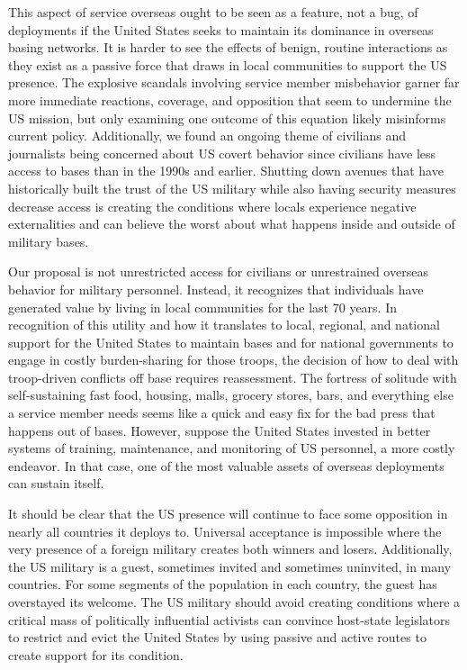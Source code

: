 This aspect of service overseas ought to be seen as a feature, not a bug, of deployments if the United States seeks to maintain its dominance in overseas basing networks. It is harder to see the effects of benign, routine interactions as they exist as a passive force that draws in local communities to support the US presence. The explosive scandals involving service member misbehavior garner far more immediate reactions, coverage, and opposition that seem to undermine the US mission, but only examining one outcome of this equation likely misinforms current policy. Additionally, we found an ongoing theme of civilians and journalists being concerned about US covert behavior since civilians have less access to bases than in the 1990s and earlier. Shutting down avenues that have historically built the trust of the US military while also having security measures decrease access is creating the conditions where locals experience negative externalities and can believe the worst about what happens inside and outside of military bases.

Our proposal is not unrestricted access for civilians or unrestrained overseas behavior for military personnel. Instead, it recognizes that individuals have generated value by living in local communities for the last 70 years. In recognition of this utility and how it translates to local, regional, and national support for the United States to maintain bases and for national governments to engage in costly burden-sharing for those troops, the decision of how to deal with troop-driven conflicts off base requires reassessment. The fortress of solitude with self-sustaining fast food, housing, malls, grocery stores, bars, and everything else a service member needs seems like a quick and easy fix for the bad press that happens out of bases. However, suppose the United States invested in better systems of training, maintenance, and monitoring of US personnel, a more costly endeavor. In that case, one of the most valuable assets of overseas deployments can sustain itself. 

It should be clear that the US presence will continue to face some opposition in nearly all countries it deploys to. Universal acceptance is impossible where the very presence of a foreign military creates both winners and losers. Additionally, the US military is a guest, sometimes invited and sometimes uninvited, in many countries. For some segments of the population in each country, the guest has overstayed its welcome. The US military should avoid creating conditions where a critical mass of politically influential activists can convince host-state legislators to restrict and evict the United States by using passive and active routes to create support for its condition. 

